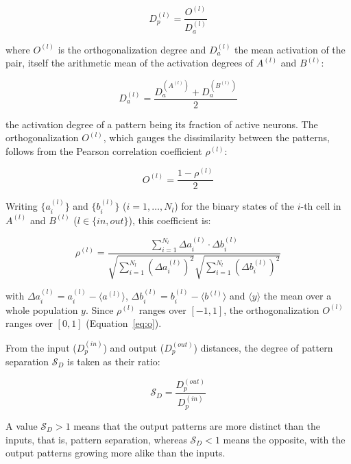 \documentclass[pdflatex,sn-basic]{sn-jnl}%
\theoremstyle{thmstyleone}%
\theoremstyle{thmstyletwo}%
\theoremstyle{thmstylethree}%
\begin{document}
\begin{equation}
    \label{eq:dp}
    D_p^{(l)} = \frac{O^{(l)}}{D_a^{(l)}}
\end{equation}

where $O^{(l)}$ is the orthogonalization degree  and $D_a^{(l)}$ the mean activation of the pair, itself the arithmetic mean of
the activation degrees of $A^{(l)}$ and $B^{(l)}$:

\begin{equation}
    \label{eq:da}
    D_a^{(l)} = \frac{D_a^{(A^{(l)})} + D_a^{(B^{(l)})}}{2}
\end{equation}

the activation degree of a pattern being its fraction of active neurons. The orthogonalization $O^{(l)}$, which gauges the
dissimilarity between the patterns, follows from the Pearson correlation coefficient $\rho^{(l)}$:

\begin{equation}
    \label{eq:o}
    O^{(l)} = \frac{1 - \rho^{(l)}}{2}
\end{equation}

Writing $\{a_i^{(l)}\}$ and $\{b_i^{(l)}\}$ ($i=1, \dots, N_l$) for the binary states of the $i$-th cell in $A^{(l)}$ and
$B^{(l)}$ ($l \in \{in, out\}$), this coefficient is:

\begin{equation}
    \label{eq:pearson}
    \rho^{(l)} = \frac{\sum_{i=1}^{N_l} \Delta a_i^{(l)} \cdot \Delta b_i^{(l)}}{\sqrt{\sum_{i=1}^{N_l} {(\Delta a_i^{(l)})}^2} \sqrt{\sum_{i=1}^{N_l} {(\Delta b_i^{(l)})}^2}}
\end{equation}

with $\Delta a_i^{(l)} = a_i^{(l)} - \langle a^{(l)} \rangle$, $\Delta b_i^{(l)} = b_i^{(l)} - \langle b^{(l)} \rangle$ and
$\langle y \rangle$ the mean over a whole population $y$. Since $\rho^{(l)}$ ranges over $[-1, 1]$, the orthogonalization
$O^{(l)}$ ranges over $[0, 1]$ (Equation~\ref{eq:o}).

From the input ($D_p^{(in)}$) and output ($D_p^{(out)}$) distances, the degree of pattern separation $\mathcal{S}_D$ is taken as
their ratio:

\begin{equation}
    \label{eq:sd}
    \mathcal{S}_D = \frac{D_p^{(out)}}{D_p^{(in)}}
\end{equation}

A value $\mathcal{S}_D > 1$ means that the output patterns are more distinct than the inputs, that is, pattern separation, whereas
$\mathcal{S}_D < 1$ means the opposite, with the output patterns growing more alike than the inputs.
\end{document}

